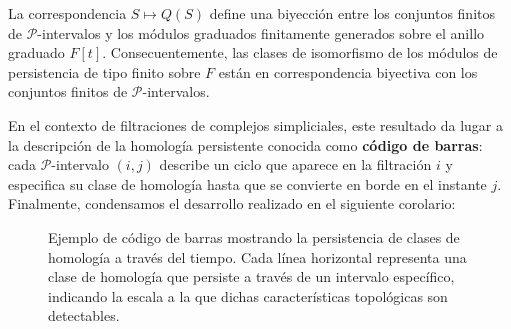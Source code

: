 \begin{corolario}
La correspondencia \( S \mapsto Q(S) \) define una biyección entre los conjuntos finitos de $\mathcal{P}$-intervalos y los módulos graduados finitamente generados sobre el anillo graduado \( F[t] \). Consecuentemente, las clases de isomorfismo de los módulos de persistencia de tipo finito sobre \( F \) están en correspondencia biyectiva con los conjuntos finitos de $\mathcal{P}$-intervalos.
\end{corolario}

En el contexto de filtraciones de complejos simpliciales, este resultado da lugar a la descripción de la homología persistente conocida como \textbf{código de barras}: cada $\mathcal{P}$-intervalo $(i, j)$ describe un ciclo que aparece en la filtración $i$ y especifica su clase de homología hasta que se convierte en borde en el instante $j$. Finalmente, condensamos el desarrollo realizado en el siguiente corolario: 

\begin{figure}
	\label{fig:barcode}
	\centering
{}
\caption{Ejemplo de código de barras mostrando la persistencia de clases de homología a través del tiempo. Cada línea horizontal representa una clase de homología que persiste a través de un intervalo específico, indicando la escala a la que dichas características topológicas son detectables.}
\end{figure}

